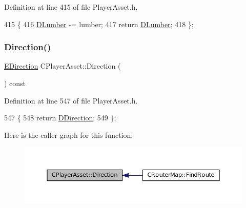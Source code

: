 Definition at line 415 of file Player\+Asset.\+h.


\begin{DoxyCode}
415                                        \{
416             \hyperlink{classCPlayerAsset_af726ea7df9596f02cdb1428d61186349}{DLumber} -= lumber;
417             \textcolor{keywordflow}{return} \hyperlink{classCPlayerAsset_af726ea7df9596f02cdb1428d61186349}{DLumber};
418         \};
\end{DoxyCode}
\hypertarget{classCPlayerAsset_add74a452e9a030ae0d04d4281d964935}{}\label{classCPlayerAsset_add74a452e9a030ae0d04d4281d964935} 
\subsubsection{\texorpdfstring{Direction()}{Direction()}\hspace{0.1cm}{\footnotesize\ttfamily [1/2]}}
{\footnotesize\ttfamily \hyperlink{GameDataTypes_8h_acb2b033915f6659a71a38b5aa6e4eb42}{E\+Direction} C\+Player\+Asset\+::\+Direction (\begin{DoxyParamCaption}{ }\end{DoxyParamCaption}) const\hspace{0.3cm}{\ttfamily [inline]}}



Definition at line 547 of file Player\+Asset.\+h.


\begin{DoxyCode}
547                                     \{
548             \textcolor{keywordflow}{return} \hyperlink{classCPlayerAsset_a2f07e280268d0402220c583d1029d683}{DDirection};
549         \};
\end{DoxyCode}
Here is the caller graph for this function\+:
\nopagebreak
\begin{figure}[H]
\begin{center}
\leavevmode
\includegraphics[width=350pt]{classCPlayerAsset_add74a452e9a030ae0d04d4281d964935_icgraph}
\end{center}
\end{figure}
\hypertarget{classCPlayerAsset_abda0d14d43b52315a40defa0a6a2440f}{}\label{classCPlayerAsset_abda0d14d43b52315a40defa0a6a2440f} 
